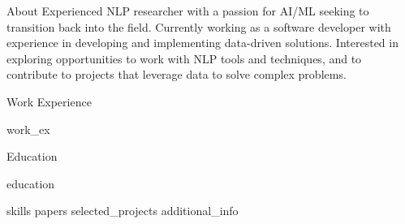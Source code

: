 \documentclass{resume} %
\begin{document}
\begin{rSection}{About}
Experienced NLP researcher with a passion for AI/ML seeking to transition back into the field. Currently working as a software developer with experience in developing and implementing data-driven solutions. Interested in exploring opportunities to work with NLP tools and techniques, and to contribute to projects that leverage data to solve complex problems.
\end{rSection}




\begin{rSection}{\faBriefcase \hspace{0.5mm} Work Experience}

    {work_ex}

\end{rSection}

\newpage
\begin{rSection}{\faGraduationCap \hspace{0.5mm} Education}

    {education}
    
\end{rSection}


{skills}
{papers}
{selected_projects}
{additional_info}


\end{document}
